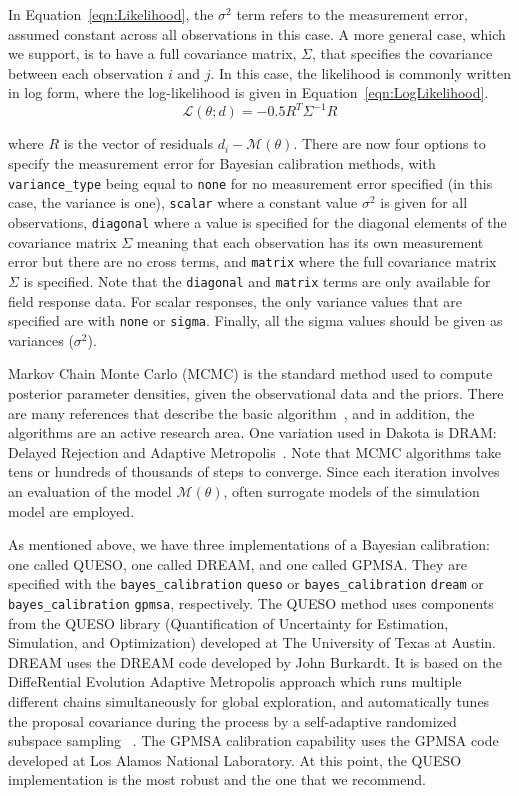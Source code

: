 In Equation~\ref{eqn:Likelihood}, the $\sigma^2$ term refers to the measurement error, assumed 
constant across all observations in this case.  A more general case, which we support, is to 
have a full covariance matrix, $\Sigma$, that specifies the covariance between each observation $i$ and $j$. 
In this case, the likelihood is commonly written in log form, where the log-likelihood is given in Equation~\ref{eqn:LogLikelihood}. 
\begin{equation}\label{eqn:LogLikelihood}  
\mathcal{L}({\theta};d) =-0.5 {R}^{T} {\Sigma}^{-1} {R}
\end{equation}

where $R$ is the vector of residuals $d_i-\mathcal{M}(\theta)$.  There are now four options to specify 
the measurement error for Bayesian calibration methods, with \texttt{variance\_type} being 
equal to \texttt{none} for no measurement error specified (in this case, the variance is one), 
\texttt{scalar} where a constant value $\sigma^2$ is given for all observations, \texttt{diagonal} where a 
value is specified for the diagonal elements of the covariance matrix $\Sigma$ meaning that each observation 
has its own measurement error but there are no cross terms, and \texttt{matrix} where the full covariance 
matrix $\Sigma$ is specified.  Note that the \texttt{diagonal} and \texttt{matrix} terms are only available 
for field response data.  For scalar responses, the only variance values that are specified are with \texttt{none} or 
\texttt{sigma}.  Finally, all the sigma values should be given as variances ($\sigma^2$).

Markov Chain Monte Carlo (MCMC) is the standard method used to compute 
posterior parameter densities, given the observational data 
and the priors. There are many references that 
describe the basic algorithm~\cite{Gilks}, and in addition, the algorithms 
are an active research area.  One variation used in Dakota is DRAM: 
Delayed Rejection and Adaptive Metropolis~\cite{Haario}. Note that 
MCMC algorithms take tens or hundreds of thousands of steps to converge. 
Since each iteration involves an evaluation of the model 
$\mathcal{M}(\theta)$, often surrogate models of the simulation 
model are employed.
 
As mentioned above, we have three implementations of a Bayesian 
calibration:  one called QUESO, one called DREAM, and one called GPMSA. 
They are specified with the \texttt{bayes\_calibration} \texttt{queso}
or \texttt{bayes\_calibration} \texttt{dream} or 
\texttt{bayes\_calibration} \texttt{gpmsa}, respectively.
The QUESO method uses components from the QUESO library
(Quantification of Uncertainty for Estimation, Simulation, and
Optimization) developed at The University of Texas at Austin.
DREAM uses the DREAM code developed by John Burkardt. 
It is based on the DiffeRential Evolution Adaptive
Metropolis approach which runs multiple different chains simultaneously
for global exploration, and automatically tunes the proposal covariance
during the process by a self-adaptive randomized subspace sampling
~\cite{Vrugt}.
The GPMSA calibration capability uses the GPMSA code developed at 
Los Alamos National Laboratory. At this point, the QUESO implementation 
is the most robust and the one that we recommend. 

